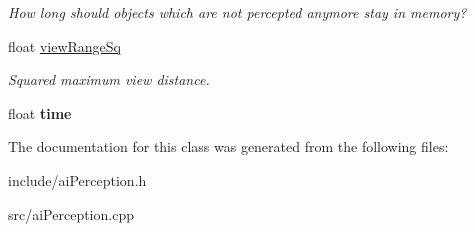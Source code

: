 \begin{DoxyCompactItemize}
\begin{DoxyCompactList}\small\item\em \-How long should objects which are not percepted anymore stay in memory? \end{DoxyCompactList}\item 
\hypertarget{classAIPerception_a6c2cbfaf6c2b1565b6b45aa81fe00f7a}{
float \hyperlink{classAIPerception_a6c2cbfaf6c2b1565b6b45aa81fe00f7a}{view\-Range\-Sq}}
\label{d4/d0b/classAIPerception_a6c2cbfaf6c2b1565b6b45aa81fe00f7a}

\begin{DoxyCompactList}\small\item\em \-Squared maximum view distance. \end{DoxyCompactList}\item 
\hypertarget{classAIPerception_a66efe86999421a03e25bc334125d87b2}{
float {\bfseries time}}
\label{d4/d0b/classAIPerception_a66efe86999421a03e25bc334125d87b2}

\end{DoxyCompactItemize}


\-The documentation for this class was generated from the following files\-:\begin{DoxyCompactItemize}
\item 
include/ai\-Perception.\-h\item 
src/ai\-Perception.\-cpp\end{DoxyCompactItemize}
